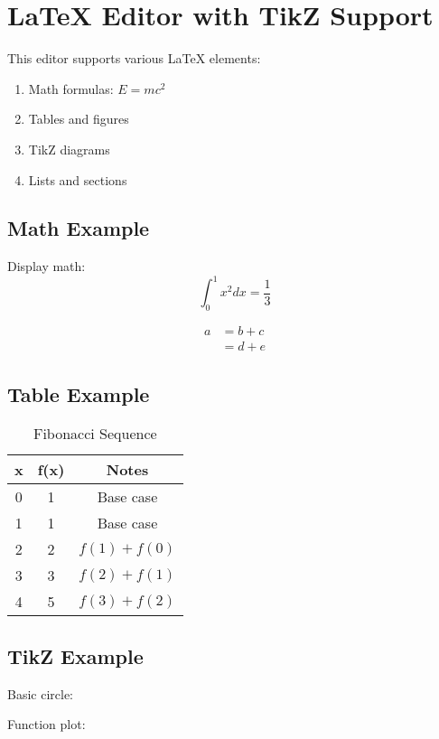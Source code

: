 \documentclass{article}
\begin{document}
\section{LaTeX Editor with TikZ Support}

This editor supports various LaTeX elements:

\begin{enumerate}
  \item Math formulas: $E = mc^2$
  \item Tables and figures
  \item TikZ diagrams
  \item Lists and sections
\end{enumerate}

\subsection{Math Example}

Display math:
$$\int_{0}^{1} x^2 dx = \frac{1}{3}$$

\begin{align}
a &= b + c \\
  &= d + e
\end{align}

\subsection{Table Example}

\begin{table}[h]
  \begin{center}
  \begin{tabular}{|c|c|c|}
      \hline
      \textbf{x} & \textbf{f(x)} & \textbf{Notes} \\
      \hline
      0 & 1 & Base case \\
      1 & 1 & Base case \\
      2 & 2 & $f(1) + f(0)$ \\
      3 & 3 & $f(2) + f(1)$ \\
      4 & 5 & $f(3) + f(2)$ \\
      \hline
  \end{tabular}
  \caption{Fibonacci Sequence}
  \end{center}
\end{table}

\subsection{TikZ Example}

Basic circle:


Function plot:

\end{document}
